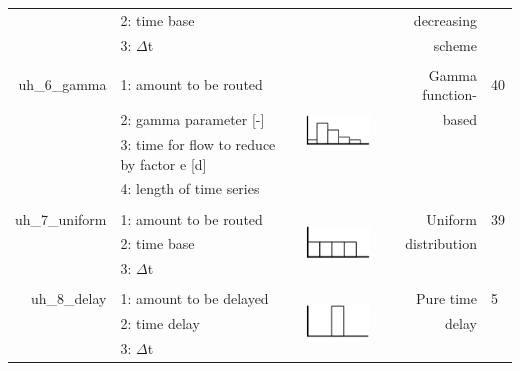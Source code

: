 \begin{table}[ht!]
\begin{tabular}{rp{10.57em}lrl}
          & 2: time base &       & \multicolumn{1}{p{8.43em}}{decreasing} &  \\
          & 3: $\Delta$t &       & \multicolumn{1}{p{8.43em}}{scheme} &  \\
          & \multicolumn{1}{l}{} &       &       &  \\
    \multicolumn{1}{p{6.215em}}{uh\_6\_gamma} & 1: amount to be routed & \multirow{4}[0]{*}{ \begin{minipage}{3cm} \includegraphics[height=1.3cm]{./AppC_graphics/uh6} \end{minipage} } & \multicolumn{1}{p{8.43em}}{Gamma function-} & 40 \\
          & 2: gamma parameter [-] &       & \multicolumn{1}{p{8.43em}}{based} &  \\
          & 3: time for flow to reduce by factor e [d] &       &       &  \\
          & 4: length of time series &       &       &  \\
          & \multicolumn{1}{l}{} &       &       &  \\
    \multicolumn{1}{p{6.215em}}{uh\_7\_uniform} & 1: amount to be routed & \multirow{3}[1]{*}{ \begin{minipage}{3cm} \includegraphics[height=1.3cm]{./AppC_graphics/uh7} \end{minipage} } & \multicolumn{1}{p{8.43em}}{Uniform} & 39 \\
          & 2: time base &       & \multicolumn{1}{p{8.43em}}{distribution} &  \\
          & 3: $\Delta$t  &       &       &  \\
          & \multicolumn{1}{l}{} &       &       &  \\

\multicolumn{1}{p{6.215em}}{uh\_8\_delay} & 1: amount to be delayed & \multirow{3}[1]{*}{ \begin{minipage}{3cm} \includegraphics[height=1.3cm]{./AppC_graphics/uh8} \end{minipage} } & \multicolumn{1}{p{8.43em}}{Pure time} & 5 \\
          & 2: time delay &       & \multicolumn{1}{p{8.43em}}{delay} &  \\
          & 3: $\Delta$t  &       &       &  \\

    \bottomrule
    \end{tabular}%
  \label{tab:uhs}%
\end{table}%